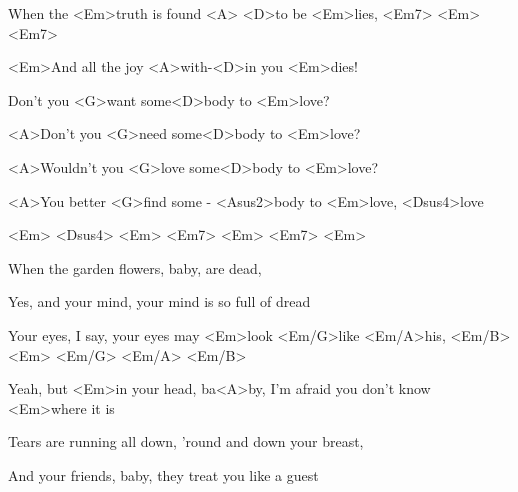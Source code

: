 


\zs
When the <Em>truth is found  <A> <D>to be <Em>lies,   <Em7> <Em> <Em7>

<Em>And all the joy <A>with-<D>in you <Em>dies!
\ks

\zr
Don't you <G>want some<D>body to <Em>love?

<A>Don't you <G>need some<D>body to <Em>love?

<A>Wouldn't you <G>love some<D>body to <Em>love?

<A>You better <G>find some - <Asus2>body to <Em>love,     <Dsus4>love

   <Em>             <Dsus4>         <Em> <Em7> <Em> <Em7>  <Em>
\kr


\zs
When the garden flowers, baby, are dead,

Yes, and your mind, your mind is so full of dread
\ks

\zr
\kr

\zs
Your eyes, I say, your eyes may <Em>look <Em/G>like   <Em/A>his, <Em/B>
<Em> <Em/G> <Em/A> <Em/B>

Yeah, but <Em>in your head, ba<A>by,
I'm afraid you don't know <Em>where it is
\ks

\zr\kr

\zs

Tears are running all down, 'round and down your breast,

And your friends, baby, they treat you like a guest
\ks

\zr\kr

\kp
